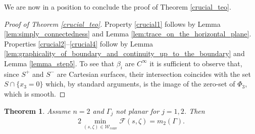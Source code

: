 \documentclass[JEP,XML,SOM,Unicode, NoFloatCountersInSection,published]{cedram}
\newcommand\admclassconv{{\mathcal W_\mathrm{conv}}}
\newtheorem{theorem}{Theorem}[section]
\theoremstyle{definition}
\begin{document}
We are now in a position to conclude the proof of Theorem \ref{crucial_teo}.

\begin{proof}[Proof of Theorem \ref{crucial_teo}]
Property \ref{crucial1} follows by Lemma \ref{lem:simply_connectedness} and Lemma \ref{lem:trace_on_the_horizontal_plane}.
Properties \ref{crucial2}--\ref{crucial4} follow by Lemma
\ref{lem:graphicality_of_boundary_and_continuity_up_to_the_boundary} and Lemma \ref{lemma_step5}. To see that $\beta_i$ are
$C^\infty$ it is sufficient to observe that, since $S^+$ and $S^-$ are Cartesian surfaces, their intersection
coincides
with the set $S\cap\{x_3=0\}$ which, by standard arguments,
is the image of the zero-set of $\Phi_3$, which is smooth.
\end{proof}
\begin{theorem}\label{teorema-finale}
{ Assume $n=2$ and $\Gamma_j$ not planar for $j=1,2$.}
Then
\begin{align}
2\min_{(s,\zeta)\in \admclassconv}\mathcal F(s,\zeta)= m_2(\Gamma).
\end{align}
\end{theorem}
\end{document}
